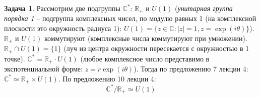 \documentclass[12pt]{article}
\theoremstyle{definition}
\newtheorem{zad}{Задача}[section]
\begin{document}
\begin{zad}
Рассмотрим две подгруппы $\mathbb{C}^*$: $\mathbb{R}_+$ и $U(1)$ (\textit{унитарная группа порядка 1} -- подгруппа комплексных чисел, по модулю равных 1 (на комплексной плоскости это окружность радиуса 1): $U(1)=\{z\in\mathbb{C}:|z|=1, z=\exp(i\theta)\}$). $\mathbb{R}_+$ и $U(1)$ коммутируют (комплексные числа коммутируют при умножении). $\mathbb{R}_+\cap U(1)=\{1\}$ (луч из центра окружности пересекается с окружностью в 1 точке). $\mathbb{C}^*=\mathbb{R}_+\cdot U(1)$ (любое комплексное число представимо в экспотенциальной форме: $z=r\exp(i\theta)$). Тогда по предложению 7 лекции 4: $\mathbb{C}^*\simeq \mathbb{R}_+ \times U(1)$. По предложению 10 лекции 4:
\begin{equation}
    \boxed{\mathbb{C}^*/\mathbb{R}_+\simeq U(1)}
\end{equation}
\end{zad}
\end{document}
